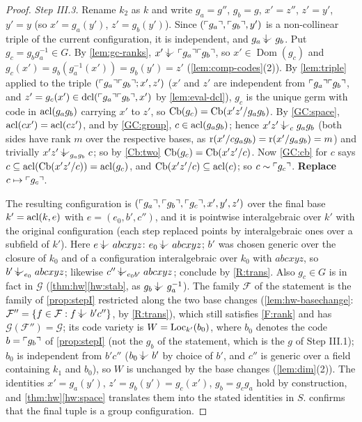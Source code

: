 \begin{proof}
\emph{Step III.3.}  Rename $k_2$ as $k$ and write $g_a=g''$, $g_b=g$, $x'=z''$, $z'=y'$,
$y'=y$ (so $x'=g_a(y')$, $z'=g_b(y')$).  Since $(\ulcorner g_a\urcorner,\ulcorner g_b\urcorner,y')$ is a
non-collinear triple of the current configuration, it is independent, and $g_a\ind{}g_b$.
Put $g_c=g_bg_a^{-1}\in G$.  By \cref{lem:gc-ranks}, $x'\ind{}\code{g_a}\code{g_b}$, so
$x'\in\operatorname{Dom}(g_c)$ and $g_c(x')=g_b(g_a^{-1}(x'))=g_b(y')=z'$
(\cref{lem:comp-codes}(2)).  By \cref{lem:triple} applied to the triple
$(\ulcorner g_a\urcorner\ulcorner g_b\urcorner;x',z')$ ($x'$ and $z'$ are independent from $\ulcorner g_a\urcorner\ulcorner g_b\urcorner$,
and $z'=g_c(x')\in\operatorname{dcl}(\ulcorner g_a\urcorner\ulcorner g_b\urcorner,x')$ by \cref{lem:eval-dcl}), $g_c$ is the unique germ with code in
$\operatorname{acl}(g_ag_b)$ carrying $x'$ to $z'$, so $\operatorname{Cb}(g_c)=\operatorname{Cb}(x'z'/g_ag_b)$.  By \ref{GC:space},
$\operatorname{acl}(cx')=\operatorname{acl}(cz')$, and by \ref{GC:group}, $c\in\operatorname{acl}(g_ag_b)$; hence
$x'z'\ind{c}g_ag_b$ (both sides have rank $m$ over the respective bases, as
$\operatorname{r}(x'/cg_ag_b)=\operatorname{r}(x'/g_ag_b)=m$) and trivially $x'z'\ind{g_ag_b}c$; so by \ref{Cb:two}
$\operatorname{Cb}(g_c)=\operatorname{Cb}(x'z'/c)$.  Now \ref{GC:cb} for $c$ says $c\subseteq\operatorname{acl}(\operatorname{Cb}(x'z'/c))=\operatorname{acl}(g_c)$,
and $\operatorname{Cb}(x'z'/c)\subseteq\operatorname{acl}(c)$; so $c\sim\ulcorner g_c\urcorner$.  \textbf{Replace}
$c\mapsto\ulcorner g_c\urcorner$.

The resulting configuration is $(\ulcorner g_a\urcorner,\ulcorner g_b\urcorner,\ulcorner g_c\urcorner,x',y',z')$ over the
final base $k'=\operatorname{acl}(k,e)$ with $e=(e_0,b',c'')$, and it is pointwise interalgebraic over
$k'$ with the original configuration (each step replaced points by interalgebraic ones
over a subfield of $k'$).  Here $e\ind{}abcxyz$: $e_0\ind{}abcxyz$; $b'$ was chosen
generic over the closure of $k_0$ and of a configuration interalgebraic over $k_0$ with
$abcxyz$, so $b'\ind{e_0}abcxyz$; likewise $c''\ind{e_0b'}abcxyz$; conclude by
\ref{R:trans}.  Also $g_c\in G$ is in fact in $\mathcal G$ (\cref{thm:hw}\ref{hw:stab},
as $g_b\ind{}g_a^{-1}$).  The family $\mathcal F$ of the statement is the family of
\cref{prop:stepI} restricted along the two base changes (\cref{lem:hw-basechange}:
$\mathcal F''=\{f\in\mathcal F:f\ind{}b'c''\}$, by \ref{R:trans}), which still satisfies
\ref{F:rank} and has $\mathcal G(\mathcal F'')=\mathcal G$; its code variety is
$W=\operatorname{Loc}_{k'}(b_0)$, where $b_0$ denotes the code $b=\ulcorner g_b\urcorner$ of \cref{prop:stepI} (not
the $g_b$ of the statement, which is the $g$ of Step III.1); $b_0$ is independent from
$b'c''$ ($b_0\ind{}b'$ by choice of $b'$, and $c''$ is generic over a field containing
$k_1$ and $b_0$), so $W$ is unchanged by the base changes (\cref{lem:dim}(2)).  The identities $x'=g_a(y')$, $z'=g_b(y')=g_c(x')$, $g_b=g_cg_a$
hold by construction, and \cref{thm:hw}\ref{hw:space} translates them into the stated
identities in $S$.   confirms that the final tuple is a group
configuration.
\end{proof}

